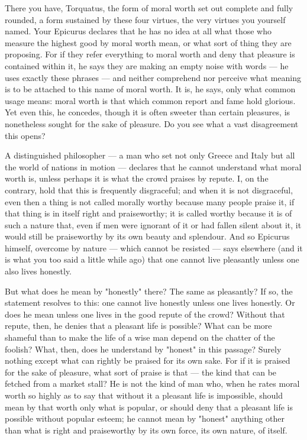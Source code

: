  There you have, Torquatus, the form of moral worth set out complete and fully rounded, a form sustained by these four virtues, the very virtues you yourself named. Your Epicurus declares that he has no idea at all what those who measure the highest good by moral worth mean, or what sort of thing they are proposing. For if they refer everything to moral worth and deny that pleasure is contained within it, he says they are making an empty noise with words — he uses exactly these phrases — and neither comprehend nor perceive what meaning is to be attached to this name of moral worth. It is, he says, only what common usage means: moral worth is that which common report and fame hold glorious. Yet even this, he concedes, though it is often sweeter than certain pleasures, is nonetheless sought for the sake of pleasure. Do you see what a vast disagreement this opens?

 A distinguished philosopher — a man who set not only Greece and Italy but all the world of nations in motion — declares that he cannot understand what moral worth is, unless perhaps it is what the crowd praises by repute. I, on the contrary, hold that this is frequently disgraceful; and when it is not disgraceful, even then a thing is not called morally worthy because many people praise it, if that thing is in itself right and praiseworthy; it is called worthy because it is of such a nature that, even if men were ignorant of it or had fallen silent about it, it would still be praiseworthy by its own beauty and splendour. And so Epicurus himself, overcome by nature — which cannot be resisted — says elsewhere (and it is what you too said a little while ago) that one cannot live pleasantly unless one also lives honestly.

 But what does he mean by "honestly" there? The same as pleasantly? If so, the statement resolves to this: one cannot live honestly unless one lives honestly. Or does he mean unless one lives in the good repute of the crowd? Without that repute, then, he denies that a pleasant life is possible? What can be more shameful than to make the life of a wise man depend on the chatter of the foolish? What, then, does he understand by "honest" in this passage? Surely nothing except what can rightly be praised for its own sake. For if it is praised for the sake of pleasure, what sort of praise is that — the kind that can be fetched from a market stall? He is not the kind of man who, when he rates moral worth so highly as to say that without it a pleasant life is impossible, should mean by that worth only what is popular, or should deny that a pleasant life is possible without popular esteem; he cannot mean by "honest" anything other than what is right and praiseworthy by its own force, its own nature, of itself.

